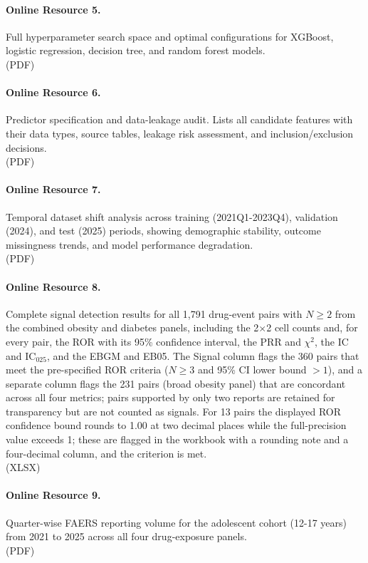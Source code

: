 \documentclass[10pt,a4paper]{article}
\begin{document}
\paragraph*{Online Resource 5.}\label{s5tab} Full hyperparameter search space and optimal configurations for XGBoost, logistic regression, decision tree, and random forest models.\\
(PDF)

\paragraph*{Online Resource 6.}\label{s6tab} Predictor specification and data-leakage audit. Lists all candidate features with their data types, source tables, leakage risk assessment, and inclusion/exclusion decisions.\\
(PDF)

\paragraph*{Online Resource 7.}\label{s7tab} Temporal dataset shift analysis across training (2021Q1-2023Q4), validation (2024), and test (2025) periods, showing demographic stability, outcome missingness trends, and model performance degradation.\\
(PDF)

\paragraph*{Online Resource 8.}\label{s8tab} Complete signal detection results for all 1,791 drug-event pairs with $N \geq 2$ from the combined obesity and diabetes panels, including the 2$\times$2 cell counts and, for every pair, the ROR with its 95\% confidence interval, the PRR and $\chi^2$, the IC and IC$_{025}$, and the EBGM and EB05. The Signal column flags the 360 pairs that meet the pre-specified ROR criteria ($N \geq 3$ and 95\% CI lower bound $> 1$), and a separate column flags the 231 pairs (broad obesity panel) that are concordant across all four metrics; pairs supported by only two reports are retained for transparency but are not counted as signals. For 13 pairs the displayed ROR confidence bound rounds to 1.00 at two decimal places while the full-precision value exceeds 1; these are flagged in the workbook with a rounding note and a four-decimal column, and the criterion is met.\\
(XLSX)

\paragraph*{Online Resource 9.}\label{s9tab} Quarter-wise FAERS reporting volume for the adolescent cohort (12-17 years) from 2021 to 2025 across all four drug-exposure panels.\\
(PDF)
\end{document}
